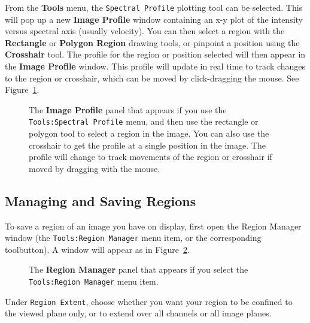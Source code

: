 From the {\bf Tools} menu, the {\tt Spectral Profile} plotting
tool can be selected.  This will pop up a new {\bf Image Profile}
window containing an x-y plot of the intensity versus spectral
axis (usually velocity).  You can then select a region with the
{\bf Rectangle} or {\bf Polygon Region} drawing tools, or pinpoint
a position using the {\bf Crosshair} tool.  The profile
for the region or position selected will then appear in the
{\bf Image Profile} window.  This profile will update in real time
to track changes to the region or crosshair, which can be moved
by click-dragging the mouse.  See Figure~\ref{fig:viewer_specprof}.

\begin{figure}[h!]
\begin{center}
\caption{\label{fig:viewer_specprof} The {\bf Image Profile} panel
that appears if you use the {\tt Tools:Spectral Profile} menu,
and then use the rectangle or polygon tool to select a region in the image.
You can also use the crosshair to get the profile at a single
position in the image.  The profile will change to track movements
of the region or crosshair if moved by dragging with the mouse.} 
\hrulefill
\end{center}
\end{figure}

\subsection{Managing and Saving Regions}
\label{section:display.image.rgnmgr}

To save a region of an image you have on display, first open the Region
Manager window (the {\tt Tools:Region Manager} menu item, or the
corresponding toolbutton).  A window will appear as in
Figure~\ref{fig:viewer_rgnmgr}.

\begin{figure}[h!]
\begin{center}
\caption{\label{fig:viewer_rgnmgr} The {\bf Region Manager} panel
that appears if you select the {\tt Tools:Region Manager} menu item.}
\hrulefill
\end{center}
\end{figure}

Under {\tt Region Extent}, choose whether you want your region to be confined
to the viewed plane only, or to extend over all channels or all image planes.

